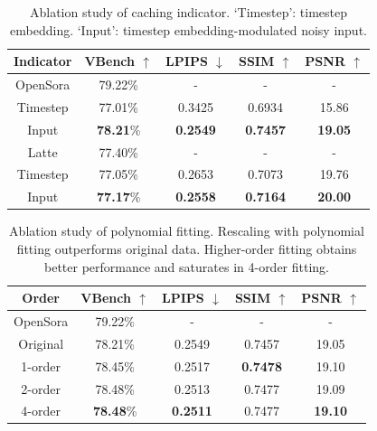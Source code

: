 \begin{table}[]
\scriptsize
\centering
    \caption{Ablation study of caching indicator. `Timestep': timestep embedding. `Input': timestep embedding-modulated noisy input.}
    \label{tab:indicator}
\begin{tabular}{c|cccc}
\toprule
\textbf{Indicator}             &\textbf{VBench $\uparrow$} & \textbf{LPIPS $\downarrow$} & \textbf{SSIM $\uparrow$} & \textbf{PSNR $\uparrow$} \\
\hline
\rowcolor[gray]{0.9}OpenSora              & 79.22\%          &  -         &  -         &  -    \\
Timestep    & 77.01\% & 0.3425          & 0.6934          & 15.86     \\
Input & \textbf{78.21}\%  & \textbf{0.2549}  & \textbf{0.7457}  & \textbf{19.05}    \\
\hline
\rowcolor[gray]{0.9}Latte              & 77.40\%          &  -         &  -         &  -    \\
Timestep    &77.05\%  & 0.2653          &   0.7073        &  19.76    \\
Input & \textbf{77.17}\% & \textbf{0.2558} & \textbf{0.7164} & \textbf{20.00}  \\
\bottomrule
\end{tabular}
\end{table}

\vspace{-0.5em}



\begin{table}[]
\scriptsize
\centering
    \caption{Ablation study of polynomial fitting. Rescaling with polynomial fitting outperforms original data. Higher-order fitting obtains better performance and saturates in 4-order fitting. }
    \label{tab:fitting}
\begin{tabular}{c|cccc}
\toprule
\textbf{Order}             &\textbf{VBench $\uparrow$} & \textbf{LPIPS $\downarrow$} & \textbf{SSIM $\uparrow$} & \textbf{PSNR $\uparrow$} \\
\hline
\rowcolor[gray]{0.9}OpenSora              & 79.22\%          &  -         &  -         &  -    \\
Original    & 78.21\%  & 0.2549  & 0.7457  & 19.05     \\
1-order &78.45\%  &0.2517  &\textbf{0.7478}  &19.10   \\
2-order &78.48\%  &0.2513  &0.7477  &19.09   \\
4-order &\textbf{78.48}\% & \textbf{0.2511} & 0.7477 & \textbf{19.10}   \\
\bottomrule
\end{tabular}
\end{table}

